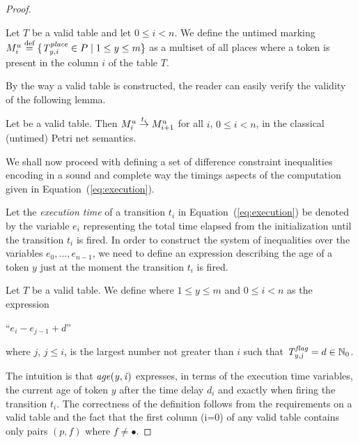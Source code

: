 \begin{proof}
\begin{definition} \label{def:untmark}
Let $T$ be a valid table and let $0 \leq i < n$.
We define the untimed marking $M_i^u \stackrel{\textrm{def}}{=} \{ {\mathit{T^{\mathit{place}}_{y,i}}} \in P \mid
1 \leq y \leq m  \}$  as a multiset of all places where a token is present
in the column $i$ of the table $T$.
\end{definition}

By the way a valid table is constructed, the reader can easily verify
the validity of the following lemma.
\begin{lemma}\label{lemma:untmarking}
Let  be a valid table.
Then $M^u_i \stackrel{t_i}{\rightarrow} M^{u}_{i+1}$ for all $i$, $0 \leq i < n$,
in the classical (untimed) Petri net semantics.
\end{lemma}

We shall now proceed with defining a set of difference constraint 
inequalities encoding in a sound and complete way 
the timings aspects of the computation given in Equation~(\ref{eq:execution}).

Let the \emph{execution time} of a transition $t_i$
in Equation~(\ref{eq:execution}) be denoted by the variable $e_i$
representing the total time elapsed from the 
initialization until the transition $t_{i}$ is fired. 
In order to construct the system of inequalities over the variables
$e_0, \ldots, e_{n-1}$, we need to define an expression describing
the age of a token $y$ just at the moment the transition $t_i$ is fired.

\begin{definition}\label{def:age}
Let $T$ be a valid table.
We define  where $1 \leq y \leq m$ and $0 \leq i < n$
as the expression 
\begin{center}
``$e_i -e_{j-1} +d$'' 
\end{center}
where $j$, $j\leq i$,
is the largest number not greater than $i$
such that ${\mathit{T^{\mathit{flag}}_{y,j}}}=d\in \mathbb{N}_{0}$. 
\end{definition}

The intuition is that ${\mathit{age({y,i})}}$ expresses, in terms of
the execution time variables, the current age
of token $y$ after the time delay $d_i$ and exactly when 
firing the transition $t_i$.
The correctness of the definition follows from the
requirements on a valid table and the fact that the first column (i=0) of 
any valid table contains only pairs $(p,f)$ where $f \not= \bullet$.


\end{proof}
